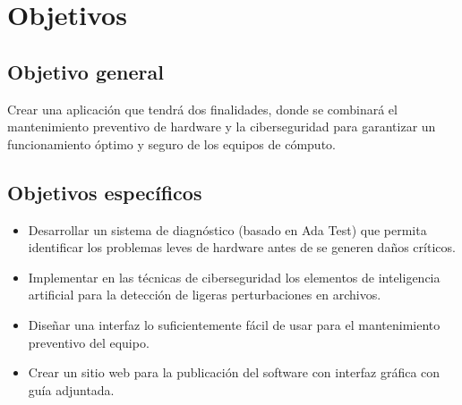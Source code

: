\pagebreak
\section{Objetivos}
\subsection{Objetivo general}

Crear una aplicación que tendrá dos finalidades, donde se combinará el
mantenimiento preventivo de hardware y la ciberseguridad para garantizar un
funcionamiento óptimo y seguro de los equipos de cómputo.

\subsection{Objetivos específicos}

\begin{itemize}
  \item
    Desarrollar un sistema de diagnóstico (basado en Ada Test) que permita
    identificar los problemas leves de hardware antes de se generen daños
    críticos.

  \item
    Implementar en las técnicas de ciberseguridad los elementos de inteligencia
    artificial para la detección de ligeras perturbaciones en archivos.

  \item
    Diseñar una interfaz lo suficientemente fácil de usar para el mantenimiento
    preventivo del equipo.

  \item
    Crear un sitio web para la publicación del software con interfaz gráfica
    con guía adjuntada.
\end{itemize}
